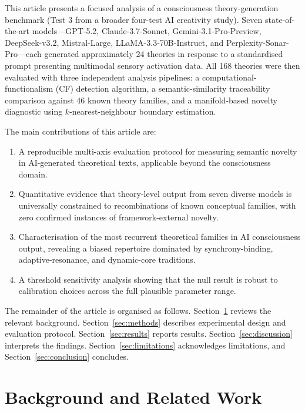 \documentclass[pdflatex,sn-mathphys-num]{sn-jnl}
\begin{document}
This article presents a focused analysis of a consciousness theory-generation
benchmark (Test 3 from a broader four-test AI creativity study).  Seven
state-of-the-art models---GPT-5.2, Claude-3.7-Sonnet,
Gemini-3.1-Pro-Preview, DeepSeek-v3.2, Mistral-Large,
LLaMA-3.3-70B-Instruct, and Perplexity-Sonar-Pro---each generated
approximately 24 theories in response to a standardised prompt presenting
multimodal sensory activation data.  All 168 theories were then evaluated with
three independent analysis pipelines: a computational-functionalism (CF)
detection algorithm, a semantic-similarity traceability comparison against 46
known theory families, and a manifold-based novelty diagnostic using
$k$-nearest-neighbour boundary estimation.

The main contributions of this article are:
\begin{enumerate}
  \item A reproducible multi-axis evaluation protocol for measuring
    semantic novelty in AI-generated theoretical texts, applicable beyond
    the consciousness domain.
  \item Quantitative evidence that theory-level output from seven diverse
    models is universally constrained to recombinations of known conceptual
    families, with zero confirmed instances of framework-external novelty.
  \item Characterisation of the most recurrent theoretical families in AI
    consciousness output, revealing a biased repertoire dominated by
    synchrony-binding, adaptive-resonance, and dynamic-core traditions.
  \item A threshold sensitivity analysis showing that the null result is
    robust to calibration choices across the full plausible parameter range.
\end{enumerate}

The remainder of the article is organised as follows.
Section~\ref{sec:background} reviews the relevant background.
Section~\ref{sec:methods} describes experimental design and evaluation
protocol.  Section~\ref{sec:results} reports results.
Section~\ref{sec:discussion} interprets the findings.
Section~\ref{sec:limitations} acknowledges limitations, and
Section~\ref{sec:conclusion} concludes.

\section{Background and Related Work}
\label{sec:background}
\end{document}
